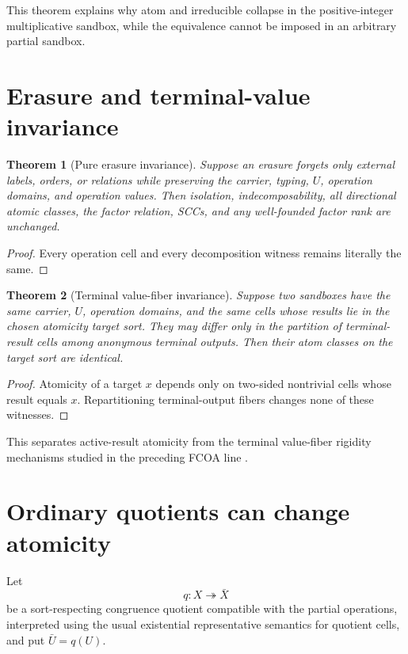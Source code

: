\documentclass[11pt]{article}
\newtheorem{theorem}{Theorem}[section]
\theoremstyle{definition}
\theoremstyle{remark}
\begin{document}
This theorem explains why atom and irreducible collapse in the positive-integer multiplicative sandbox, while the equivalence cannot be imposed in an arbitrary partial sandbox.

\section{Erasure and terminal-value invariance}

\begin{theorem}[Pure erasure invariance]
Suppose an erasure forgets only external labels, orders, or relations while preserving the carrier, typing, \(U\), operation domains, and operation values. Then isolation, indecomposability, all directional atomic classes, the factor relation, SCCs, and any well-founded factor rank are unchanged.
\end{theorem}

\begin{proof}
Every operation cell and every decomposition witness remains literally the same.
\end{proof}

\begin{theorem}[Terminal value-fiber invariance]
Suppose two sandboxes have the same carrier, \(U\), operation domains, and the same cells whose results lie in the chosen atomicity target sort. They may differ only in the partition of terminal-result cells among anonymous terminal outputs. Then their atom classes on the target sort are identical.
\end{theorem}

\begin{proof}
Atomicity of a target \(x\) depends only on two-sided nontrivial cells whose result equals \(x\). Repartitioning terminal-output fibers changes none of these witnesses.
\end{proof}

This separates active-result atomicity from the terminal value-fiber rigidity mechanisms studied in the preceding FCOA line \cite{MalachevskyFCOA2026}.

\section{Ordinary quotients can change atomicity}

Let
\[
q:X\twoheadrightarrow\bar X
\]
be a sort-respecting congruence quotient compatible with the partial operations, interpreted using the usual existential representative semantics for quotient cells, and put \(\bar U=q(U)\).
\end{document}
